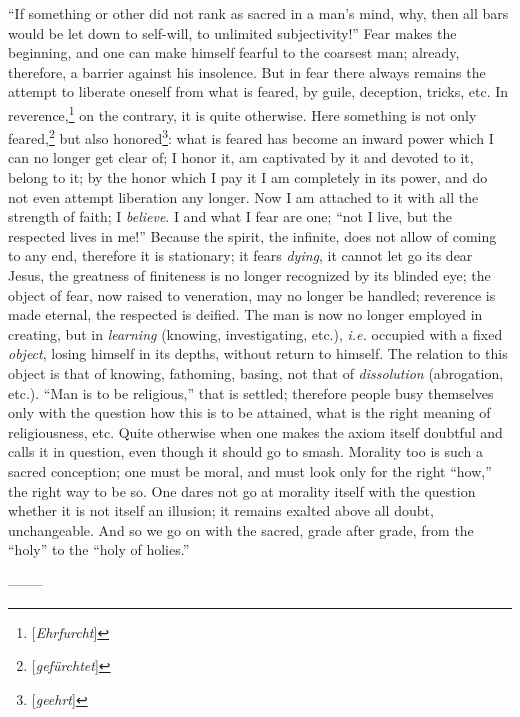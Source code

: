 \documentclass[12pt,a4paper]{book}
\begin{document}
 ``If something or other did not rank as sacred in a man's mind, why, then 
all bars would be let down to self-will, to unlimited subjectivity!'' Fear 
makes the beginning, and one can make himself fearful to the coarsest man; 
already, therefore, a barrier against his insolence. But in fear there always 
remains the attempt to liberate oneself from what is feared, by guile, 
deception, tricks, etc. In reverence,\footnote{[\textit{Ehrfurcht}]} on the 
contrary, it is quite otherwise. Here something is not only 
feared,\footnote{[\textit{gef\"urchtet}]} but also 
honored\footnote{[\textit{geehrt}]}: what is feared has become an inward power 
which I can no longer get clear of; I honor it, am captivated by it and 
devoted to it, belong to it; by the honor which I pay it I am completely in 
its power, and do not even attempt liberation any longer. Now I am attached to 
it with all the strength of faith; I \textit{believe}. I and what I fear are 
one; ``not I live, but the respected lives in me!'' Because the spirit, the 
infinite, does not allow of coming to any end, therefore it is stationary; it 
fears \textit{dying}, it cannot let go its dear Jesus, the greatness of 
finiteness is no longer recognized by its blinded eye; the object of fear, now 
raised to veneration, may no longer be handled; reverence is made eternal, the 
respected is deified. The man is now no longer employed in creating, but in 
\textit{learning} (knowing, investigating, etc.), \textit{i.e.} occupied with 
a fixed \textit{object}, losing himself in its depths, without return to 
himself. The relation to this object is that of knowing, fathoming, basing, 
not that of \textit{dissolution} (abrogation, etc.). ``Man is to be 
religious,'' that is settled; therefore people busy themselves only with the 
question how this is to be attained, what is the right meaning of 
religiousness, etc. Quite otherwise when one makes the axiom itself doubtful 
and calls it in question, even though it should go to smash. Morality too is 
such a sacred conception; one must be moral, and must look only for the right 
``how,'' the right way to be so. One dares not go at morality itself with 
the question whether it is not itself an illusion; it remains exalted above 
all doubt, unchangeable. And so we go on with the sacred, grade after grade, 
from the ``holy'' to the ``holy of holies.''

\begin{center}
--------\end{center}
\end{document}
